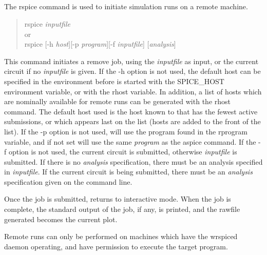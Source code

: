 \subsection{}
\label{rspice}


The {\cb rspice} command is used to initiate simulation runs on a
remote machine.
\begin{quote}\vt
rspice {\it inputfile\/}\\
{\rm or}\\
rspice [-h {\it host\/}][-p {\it program\/}][-f {\it inputfile\/}]
[{\it analysis\/}]
\end{quote}
This command initiates a remove {\WRspice} job, using the {\it
inputfile} as input, or the current circuit if no {\it inputfile} is
given.  If the {\vt -h} option is not used, the default host can be
specified in the environment before {\WRspice} is started with the
{\et SPICE\_HOST} environment variable, or with the {\et rhost}
variable.  In addition, a list of hosts which are nominally available
for remote runs can be generated with the {\et rhost} command.  The
default host used is the host known to {\WRspice} that has the fewest
active submissions, or which appears last on the list (hosts are added
to the front of the list).  If the {\vt -p} option is not used,
{\WRspice} will use the program found in the {\et rprogram} variable,
and if not set will use the same {\it program} as the {\cb aspice}
command.  If the {\vt -f} option is not used, the current circuit is
submitted, otherwise {\it inputfile} is submitted.  If there is no
{\it analysis} specification, there must be an analysis specified in
{\it inputfile}.  If the current circuit is being submitted, there
must be an {\it analysis} specification given on the command line.

Once the job is submitted, {\WRspice} returns to interactive mode. 
When the job is complete, the standard output of the job, if any, is
printed, and the rawfile generated becomes the current plot.

Remote runs can only be performed on machines which have the {\vt
wrspiced} daemon operating, and have permission to execute the target
program.

\subsection{}


